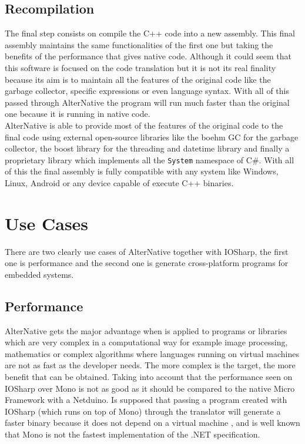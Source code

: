 \subsection{Recompilation}\label{SS:AN-Process-Recompilation}
The final step consists on compile the C++ code into a new assembly. This final assembly maintains the same functionalities of the first one but taking the benefits of the performance that gives native code. Although it could seem that this software is focused on the code translation but it is not its real finality because its aim is to maintain all the features of the original code like the garbage collector, specific expressions or even language syntax. With all of this passed through AlterNative the program will run much faster than the original one because it is running in native code.
\\
AlterNative is able to provide most of the features of the original code to the final code using external open-source libraries like the boehm GC for the garbage collector, the boost library for the threading and datetime library and finally a proprietary library which implements all the \verb!System! namespace of C\#. With all of this the final assembly is fully compatible with any system like Windows, Linux, Android or any device capable of execute C++ binaries.

\section{Use Cases}\label{S:AN-Use-Cases}
There are two clearly use cases of AlterNative together with IOSharp, the first one is performance and the second one is generate cross-platform programs for embedded systems.
\subsection{Performance}\label{SS:AN-Use-Cases-Perf}
AlterNative gets the major advantage when is applied to programs or libraries which are very complex in a computational way for example image processing, mathematics or complex algorithms where languages running on virtual machines are not as fast as the developer needs. The more complex is the target, the more benefit that can be obtained.
Taking into account that the performance seen on IOSharp over Mono is not as good as it should be compared to the native Micro Framework with a Netduino. Is supposed that passing a program created with IOSharp (which runs on top of Mono) through the translator will generate a faster binary because it does not depend on a virtual machine , and is well known that Mono is not the fastest implementation of the .NET specification.

